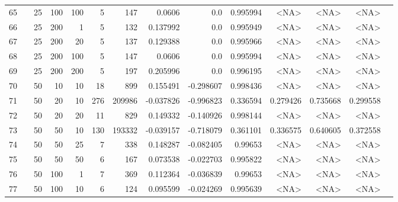 \begin{longtable}{llrrrrrrrrrrrr}
		65  & &           25 &               100 &          100 &           5 &        147 &    0.0606 &       0.0 &  0.995994 &        <NA> &           <NA> &      <NA> \\
		66  & &           25 &               200 &            1 &           5 &        132 &  0.137992 &       0.0 &  0.995949 &        <NA> &           <NA> &      <NA> \\
		67  & &           25 &               200 &           20 &           5 &        137 &  0.129388 &       0.0 &  0.995966 &        <NA> &           <NA> &      <NA> \\
		68  & &           25 &               200 &          100 &           5 &        147 &    0.0606 &       0.0 &  0.995994 &        <NA> &           <NA> &      <NA> \\
		69  & &           25 &               200 &          200 &           5 &        197 &  0.205996 &       0.0 &  0.996195 &        <NA> &           <NA> &      <NA> \\
		70  & &           50 &                10 &           10 &          18 &        899 &  0.155491 & -0.298607 &  0.998436 &        <NA> &           <NA> &      <NA> \\
		71  & &           50 &                20 &           10 &         276 &     209986 & -0.037826 & -0.996823 &  0.336594 &    0.279426 &       0.735668 &  0.299558 \\
		72  & &           50 &                20 &           20 &          11 &        829 &  0.149332 & -0.140926 &  0.998144 &        <NA> &           <NA> &      <NA> \\
		73  & &           50 &                50 &           10 &         130 &     193332 & -0.039157 & -0.718079 &  0.361101 &    0.336575 &       0.640605 &  0.372558 \\
		74  & \multirow[b]{10}{*}{\rotatebox[origin=l]{90}{sbert-default}} &           50 &                50 &           25 &           7 &        338 &  0.148287 & -0.082405 &   0.99653 &        <NA> &           <NA> &      <NA> \\
		75  & &           50 &                50 &           50 &           6 &        167 &  0.073538 & -0.022703 &  0.995822 &        <NA> &           <NA> &      <NA> \\
		76  & &           50 &               100 &            1 &           7 &        369 &  0.112364 & -0.036839 &   0.99653 &        <NA> &           <NA> &      <NA> \\
		77  & &           50 &               100 &           10 &           6 &        124 &  0.095599 & -0.024269 &  0.995639 &        <NA> &           <NA> &      <NA> \\

\end{longtable}

